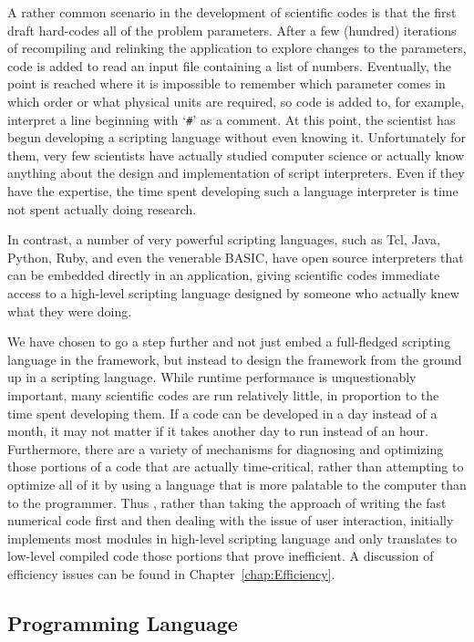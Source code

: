 A rather common scenario in the development of scientific codes is
that the first draft hard-codes all of the problem parameters.  After
a few (hundred) iterations of recompiling and relinking the
application to explore changes to the parameters, code is added to
read an input file containing a list of numbers.  Eventually, the
point is reached where it is impossible to remember which parameter
comes in which order or what physical units are required, so code is
added to, for example, interpret a line beginning with `\verb|#|' as a
comment.  At this point, the scientist has begun developing a
scripting language without even knowing it.  Unfortunately for them,
very few scientists have actually studied computer science or actually
know anything about the design and implementation of script
interpreters.  Even if they have the expertise, the time spent
developing such a language interpreter is time not spent actually
doing research.

In contrast, a number of very powerful scripting languages, such as
Tcl, Java, Python, Ruby, and even the venerable BASIC, have open
source interpreters that can be embedded directly in an application,
giving scientific codes immediate access to a high-level scripting
language designed by someone who actually knew what they were doing.

We have chosen to go a step further and not just embed a full-fledged
scripting language in the \FiPy{} framework, but instead to design the
framework from the ground up in a scripting language.  While runtime
performance is unquestionably important, many scientific codes are run
relatively little, in proportion to the time spent developing them.
If a code can be developed in a day instead of a month, it may not
matter if it takes another day to run instead of an hour.
Furthermore, there are a variety of mechanisms for diagnosing and
optimizing those portions of a code that are actually time-critical,
rather than attempting to optimize all of it by using a language that
is more palatable to the computer than to the programmer.  Thus
\FiPy{}, rather than taking the approach of writing the fast numerical
code first and then dealing with the issue of user interaction,
initially implements most modules in high-level scripting language and
only translates to low-level compiled code those portions that prove
inefficient. A discussion of efficiency issues can be found in
Chapter~\ref{chap:Efficiency}.

\subsection{\Python{} Programming Language}

